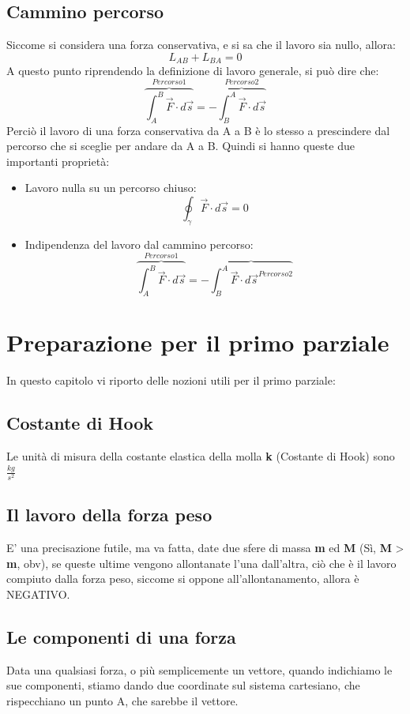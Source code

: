 \documentclass[12pt, a4paper, openany, oneside]{book}
\begin{document}
\section{Cammino percorso}
Siccome si considera una forza conservativa, e si sa che il lavoro sia nullo, 
allora: 
\[
L_{AB} + L_{BA} = 0
\]	
A questo punto riprendendo la definizione di lavoro generale, si può
dire che: 
\[
\overbrace{\int_{A}^{B} \overrightarrow{F} \cdot d \overrightarrow{s}}^{Percorso 1}
= - \overbrace{\int_{B}^{A} \overrightarrow{F} \cdot d \overrightarrow{s}}^{Percorso 2}
\]    
Perciò il lavoro di una forza conservativa da A a B è lo stesso a prescindere dal 
percorso che si sceglie per andare da A a B. Quindi si hanno queste due 
importanti proprietà: 
\begin{itemize}
	\item Lavoro nulla su un percorso chiuso: 
	\[
	\oint_{\gamma} \overrightarrow{F} \cdot d\overrightarrow{s} = 0
	\]
	\item Indipendenza del lavoro dal cammino percorso: 
	\[
	\overbrace{\int_{A}^{B} \overrightarrow{F} \cdot d \overrightarrow{s}}^{Percorso 1}
	= - \overbrace{\int_{B}^{A} \overrightarrow{F} \cdot d \overrightarrow{s}^{Percorso 2}}
	\]    
\end{itemize}
\chapter{Preparazione per il primo parziale}
In questo capitolo vi riporto delle nozioni utili per il primo parziale:
\section{Costante di Hook}
Le unità di misura della costante elastica della molla \textbf{k} (Costante di 
Hook) sono $\frac{kg}{s^{2}}$ 
\section{Il lavoro della forza peso}
E' una precisazione futile, ma va fatta, date due sfere di massa \textbf{m} ed 
\textbf{M} (Sì, \textbf{M} > \textbf{m}, obv), se queste ultime vengono allontanate
l'una dall'altra, ciò che è il lavoro compiuto dalla forza peso, siccome si 
oppone all'allontanamento, allora è NEGATIVO.
\section{Le componenti di una forza}
Data una qualsiasi forza, o più semplicemente un vettore, quando indichiamo le 
sue componenti, stiamo dando due coordinate sul sistema cartesiano, che rispecchiano
un punto A, che sarebbe il vettore. 
\end{document}
